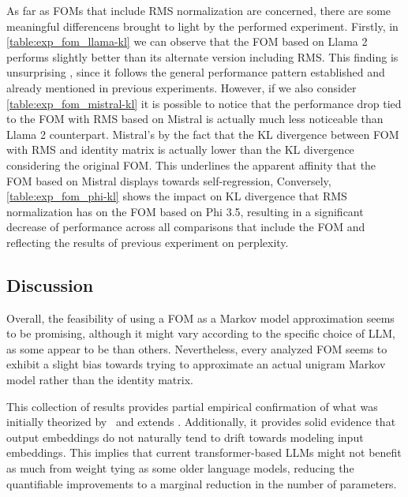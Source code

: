 As far as FOMs that include RMS normalization are concerned, there are some meaningful differencens brought to light by the performed experiment.
Firstly, in \cref{table:exp_fom_llama-kl} we can observe that the FOM based on Llama 2 performs slightly better than its alternate version including RMS.
This finding is unsurprising , since it follows the general performance pattern established and already mentioned in previous experiments.
However, if we also consider \cref{table:exp_fom_mistral-kl} it is possible to notice that the performance drop tied to the FOM with RMS based on Mistral is actually much less noticeable than  Llama 2 counterpart.
Mistral's  by the fact that the KL divergence between FOM with RMS and identity matrix is actually lower than the KL divergence considering the original FOM.
This underlines the apparent affinity that the FOM based on Mistral displays towards self-regression,
Conversely, \cref{table:exp_fom_phi-kl} shows the  impact on KL divergence that RMS normalization has on the FOM based  on Phi 3.5, resulting in a significant decrease of performance across all comparisons that include the FOM and reflecting the results of  previous experiment on perplexity.

\subsection{Discussion}\label{ssec:exp_fom_discussion}

Overall, the feasibility of using a FOM as a Markov model approximation seems to be promising, although it might vary according to the specific choice of LLM, as some appear to be  than others.
Nevertheless, every analyzed FOM seems to exhibit a slight bias towards trying to approximate an actual unigram Markov model rather than the identity matrix.

This collection of results provides partial empirical confirmation of what was initially theorized by~\citet{elhage2021} and extends .
Additionally, it provides solid evidence that output embeddings do not naturally tend to drift towards modeling input embeddings.
This implies that current transformer-based LLMs might not benefit as much from weight tying as some older language models, reducing the quantifiable improvements to a marginal reduction in the number of parameters.

